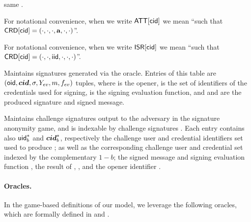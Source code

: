 \begin{description}
  same \uid.
\item[\ATTR.] For notational convenience, when we write $\mathsf{ATT}[\mathsf{cid}]$ we mean
  ``\attrs such that $\mathsf{CRD}[\mathsf{cid}] = (\cdot,\cdot,\cdot,\mathbf{a},\cdot,\cdot)$''.
\item[\ISR.] For notational convenience, when we write $\mathsf{ISR}[\mathsf{cid}]$ we mean
  ``\iid such that $\mathsf{CRD}[\mathsf{cid}] = (\cdot,\cdot,\mathsf{iid},\cdot,\cdot,\cdot)$''.
\item[\SIG.] Maintains signatures generated via the \SIGN oracle. Entries of
  this table are $(\mathsf{oid},\boldsymbol{cid},\sigma,Y_{ev},m,f_{ev})$ tuples, where \oid is
  the opener, \scid is the set of identifiers of the credentials used for
  signing, \feval is the signing evaluation function, and \sig and \msg are the
  produced signature and signed message.
\item[\CSIG.] Maintains challenge signatures output to the adversary in the
  signature anonymity game, and is indexable by challenge signatures \csig.
  Each entry contains also $\mathsf{uid}^*_b$ and $\boldsymbol{cid}^*_b$, respectively the challenge
  user  and credential identifiers set used to produce \csig; as well as the
  corresponding challenge user and credential set indexed by the complementary
  $1-b$; the signed message \msg and signing evaluation function \feval, the
  result of \feval, \Yeval, and the opener identifier \oid.
\end{description}

\paragraph{Oracles.} %
In the game-based definitions of our \UAS model, we leverage the following
oracles, which are formally defined in  and
. 

